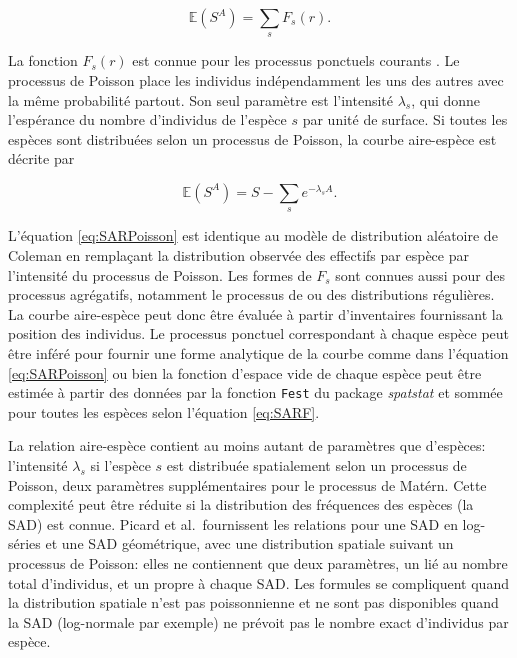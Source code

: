 \documentclass[
  11pt,
  french,
  a4paper,
  extrafontsizes,onecolumn,openright
  ]{memoir}
\newlength{\rf}
\begin{document}
\begin{equation}
  \label{eq:SARF}
  {\mathbb E}\left( S^A \right)  = \sum_s{F_s\left( r \right) }.
\end{equation}

La fonction \(F_s(r)\) est connue pour les processus ponctuels courants \autocite{Cressie1993,Stoyan1994}.
Le processus de Poisson place les individus indépendamment les uns des autres avec la même probabilité partout.
Son seul paramètre est l'intensité \(\lambda_s\), qui donne l'espérance du nombre d'individus de l'espèce \(s\) par unité de surface.
Si toutes les espèces sont distribuées selon un processus de Poisson, la courbe aire-espèce est décrite par

\begin{equation}
  \label{eq:SARPoisson}
  {\mathbb E}\left( S^A \right)  = S - \sum_s{e^{-\lambda_s A}}.
\end{equation}

L'équation \eqref{eq:SARPoisson} est identique au modèle de distribution aléatoire de Coleman en remplaçant la distribution observée des effectifs par espèce par l'intensité du processus de Poisson.
Les formes de \(F_s\) sont connues aussi pour des processus agrégatifs, notamment le processus de \textcite{Matern1960} ou des distributions régulières.
La courbe aire-espèce peut donc être évaluée à partir d'inventaires fournissant la position des individus.
Le processus ponctuel correspondant à chaque espèce peut être inféré pour fournir une forme analytique de la courbe comme dans l'équation \eqref{eq:SARPoisson} ou bien la fonction d'espace vide de chaque espèce peut être estimée à partir des données par la fonction \texttt{Fest} du package \emph{spatstat} et sommée pour toutes les espèces selon l'équation \eqref{eq:SARF}.

La relation aire-espèce contient au moins autant de paramètres que d'espèces: l'intensité \(\lambda_s\) si l'espèce \(s\) est distribuée spatialement selon un processus de Poisson, deux paramètres supplémentaires pour le processus de Matérn.
Cette complexité peut être réduite si la distribution des fréquences des espèces (la SAD) est connue.
Picard et al.~fournissent les relations pour une SAD en log-séries et une SAD géométrique, avec une distribution spatiale suivant un processus de Poisson: elles ne contiennent que deux paramètres, un lié au nombre total d'individus, et un propre à chaque SAD.
Les formules se compliquent quand la distribution spatiale n'est pas poissonnienne et ne sont pas disponibles quand la SAD (log-normale par exemple) ne prévoit pas le nombre exact d'individus par espèce.
\end{document}
